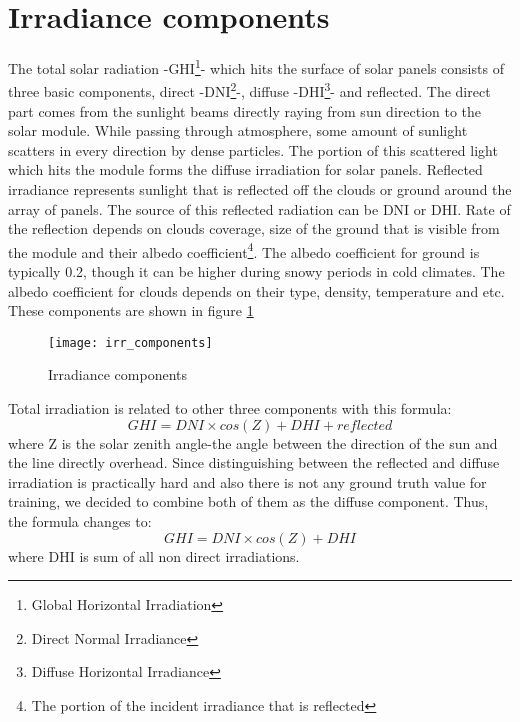 \section{Irradiance components}
The total solar radiation -GHI\footnote{Global Horizontal Irradiation}- which hits the surface of solar panels consists of three basic components, direct -DNI\footnote{Direct Normal Irradiance}-, diffuse -DHI\footnote{Diffuse Horizontal Irradiance}- and reflected. The direct part comes from the sunlight beams directly raying from sun direction to the solar module. While passing through atmosphere, some amount of sunlight scatters in every direction by dense particles. The portion of this scattered light which hits the module forms the diffuse irradiation for solar panels. 
Reflected irradiance represents sunlight that is reflected off the clouds or ground around the array of panels. The source of this reflected radiation can be DNI or DHI. Rate of the reflection depends on clouds coverage, size of the ground that is visible from the module and their albedo coefficient\footnote{The portion of the incident irradiance that is reflected}. The albedo coefficient for ground is typically 0.2, though it can be higher during snowy periods in cold climates. The albedo coefficient for clouds depends on their type, density, temperature and etc. These components are shown in figure 	\ref{fig:irr_comps}

\begin{figure}[h]
\caption{Irradiance components}
\label{fig:irr_comps}
\texttt{[image: irr\_components]}
\centering
\end{figure} 

Total irradiation is related to other three components with this formula:
\[ GHI = DNI \times cos (Z) + DHI + reflected \]
where Z is the solar zenith angle-the angle between the direction of the sun and the line directly overhead.
Since distinguishing between the reflected and diffuse irradiation is practically hard and also there is not any ground truth value for training, we decided to combine both of them as the diffuse component. Thus, the formula changes to:
\begin{equation}
GHI = DNI \times cos (Z) + DHI
\end{equation}
where DHI is sum of all non direct irradiations.
